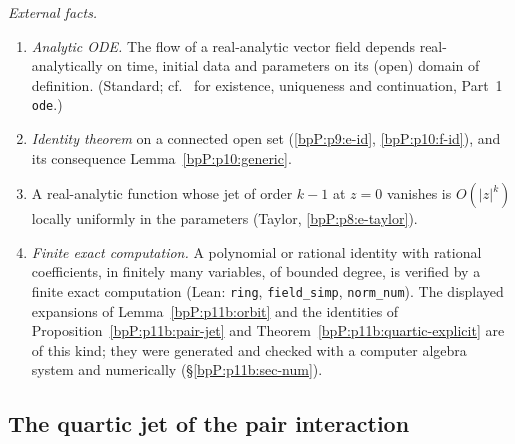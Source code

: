 \emph{External facts.}
\begin{enumerate}[label=(F\arabic*),ref=(F\arabic*)]
\item\label{bpP:p11b:e-ode} \emph{Analytic ODE.} The flow of a real-analytic vector field depends real-analytically on time, initial data and parameters on its (open) domain of definition. (Standard; cf.\  for existence, uniqueness and continuation, Part~1 \texttt{ode}.)
\item\label{bpP:p11b:e-id} \emph{Identity theorem} on a connected open set (\ref{bpP:p9:e-id}, \ref{bpP:p10:f-id}), and its consequence Lemma~\ref{bpP:p10:generic}.
\item\label{bpP:p11b:e-jet} A real-analytic function whose jet of order $k-1$ at $z=0$ vanishes is $O(|z|^k)$ locally uniformly in the parameters (Taylor, \ref{bpP:p8:e-taylor}).
\item\label{bpP:p11b:e-ca} \emph{Finite exact computation.} A polynomial or rational identity with rational coefficients, in finitely many variables, of bounded degree, is verified by a finite exact computation (Lean: \texttt{ring}, \texttt{field\_simp}, \texttt{norm\_num}). The displayed expansions of Lemma~\ref{bpP:p11b:orbit} and the identities of Proposition~\ref{bpP:p11b:pair-jet} and Theorem~\ref{bpP:p11b:quartic-explicit} are of this kind; they were generated and checked with a computer algebra system and numerically (\S\ref{bpP:p11b:sec-num}).
\end{enumerate}

\subsection{The quartic jet of the pair interaction}\label{bpP:p11b:sec-quartic}


